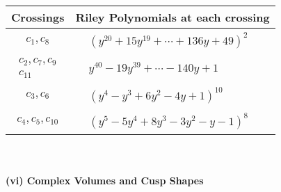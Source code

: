 \documentclass[1p]{elsarticle_modified}
\theoremstyle{definition}
\begin{document}
\begin{tabular}{m{50pt}|m{274pt}}
Crossings & \hspace{64pt}Riley Polynomials at each crossing \\
\hline $$\begin{aligned}c_{1},c_{8}\end{aligned}$$&$\begin{aligned}
&(y^{20}+15 y^{19}+\cdots+136 y+49)^{2}
\end{aligned}$\\
\hline $$\begin{aligned}c_{2},c_{7},c_{9}\\c_{11}\end{aligned}$$&$\begin{aligned}
&y^{40}-19 y^{39}+\cdots-140 y+1
\end{aligned}$\\
\hline $$\begin{aligned}c_{3},c_{6}\end{aligned}$$&$\begin{aligned}
&(y^4- y^3+6 y^2-4 y+1)^{10}
\end{aligned}$\\
\hline $$\begin{aligned}c_{4},c_{5},c_{10}\end{aligned}$$&$\begin{aligned}
&(y^5-5 y^4+8 y^3-3 y^2- y-1)^8
\end{aligned}$\\
\hline
\end{tabular}\\~\\
\newpage\flushleft \textbf{(vi) Complex Volumes and Cusp Shapes}
\end{document}
